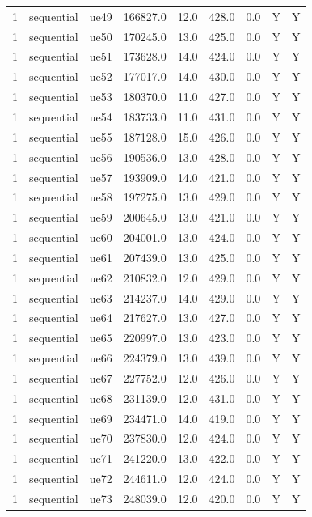 \begin{table}[ht]
\begin{tabular}{|c|c|c|c|c|c|c|c|c|}
1 & sequential & ue49 & 166827.0 & 12.0 & 428.0 & 0.0 & Y & Y \\
1 & sequential & ue50 & 170245.0 & 13.0 & 425.0 & 0.0 & Y & Y \\
1 & sequential & ue51 & 173628.0 & 14.0 & 424.0 & 0.0 & Y & Y \\
1 & sequential & ue52 & 177017.0 & 14.0 & 430.0 & 0.0 & Y & Y \\
1 & sequential & ue53 & 180370.0 & 11.0 & 427.0 & 0.0 & Y & Y \\
1 & sequential & ue54 & 183733.0 & 11.0 & 431.0 & 0.0 & Y & Y \\
1 & sequential & ue55 & 187128.0 & 15.0 & 426.0 & 0.0 & Y & Y \\
1 & sequential & ue56 & 190536.0 & 13.0 & 428.0 & 0.0 & Y & Y \\
1 & sequential & ue57 & 193909.0 & 14.0 & 421.0 & 0.0 & Y & Y \\
1 & sequential & ue58 & 197275.0 & 13.0 & 429.0 & 0.0 & Y & Y \\
1 & sequential & ue59 & 200645.0 & 13.0 & 421.0 & 0.0 & Y & Y \\
1 & sequential & ue60 & 204001.0 & 13.0 & 424.0 & 0.0 & Y & Y \\
1 & sequential & ue61 & 207439.0 & 13.0 & 425.0 & 0.0 & Y & Y \\
1 & sequential & ue62 & 210832.0 & 12.0 & 429.0 & 0.0 & Y & Y \\
1 & sequential & ue63 & 214237.0 & 14.0 & 429.0 & 0.0 & Y & Y \\
1 & sequential & ue64 & 217627.0 & 13.0 & 427.0 & 0.0 & Y & Y \\
1 & sequential & ue65 & 220997.0 & 13.0 & 423.0 & 0.0 & Y & Y \\
1 & sequential & ue66 & 224379.0 & 13.0 & 439.0 & 0.0 & Y & Y \\
1 & sequential & ue67 & 227752.0 & 12.0 & 426.0 & 0.0 & Y & Y \\
1 & sequential & ue68 & 231139.0 & 12.0 & 431.0 & 0.0 & Y & Y \\
1 & sequential & ue69 & 234471.0 & 14.0 & 419.0 & 0.0 & Y & Y \\
1 & sequential & ue70 & 237830.0 & 12.0 & 424.0 & 0.0 & Y & Y \\
1 & sequential & ue71 & 241220.0 & 13.0 & 422.0 & 0.0 & Y & Y \\
1 & sequential & ue72 & 244611.0 & 12.0 & 424.0 & 0.0 & Y & Y \\
1 & sequential & ue73 & 248039.0 & 12.0 & 420.0 & 0.0 & Y & Y \\

\end{tabular}
\end{table}
